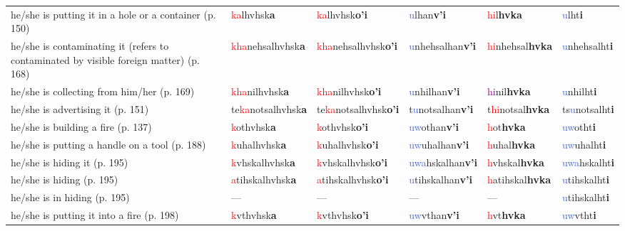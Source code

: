 \documentclass[oneside,openany]{book}%
\begin{document}
\begin{tabularx}{\textwidth}{>{\hsize=1.5\hsize\RaggedRight}X >{\hsize=0.9\hsize}X >{\hsize=0.9\hsize}X >{\hsize=0.9\hsize}X >{\hsize=0.9\hsize}X >{\hsize=0.9\hsize}X}
he/she is putting it in a hole or a container (p. 150)&\textcolor{Red}{ka}lhvhsk\textbf{a}&\textcolor{Red}{ka}lhvhsk\textbf{o'i}&\textcolor{RoyalBlue}{u}lhan\textbf{v'i}&\textcolor{Red}{hi}l\textbf{hvka}&\textcolor{RoyalBlue}{u}lht\textbf{i}\\%
he/she is contaminating it (refers to contaminated by visible foreign matter) (p. 168)&\textcolor{Red}{kha}nehsalhvhsk\textbf{a}&\textcolor{Red}{kha}nehsalhvhsk\textbf{o'i}&\textcolor{RoyalBlue}{u}nhehsalhan\textbf{v'i}&\textcolor{Red}{hi}nhehsal\textbf{hvka}&\textcolor{RoyalBlue}{u}nhehsalht\textbf{i}\\%
he/she is collecting from him/her (p. 169)&\textcolor{Red}{kha}nilhvhsk\textbf{a}&\textcolor{Red}{kha}nilhvhsk\textbf{o'i}&\textcolor{RoyalBlue}{u}nhilhan\textbf{v'i}&\textcolor{Purple}{hi}nil\textbf{hvka}&\textcolor{RoyalBlue}{u}nhilht\textbf{i}\\%
he/she is advertising it (p. 151)&te\textcolor{Red}{ka}notsalhvhsk\textbf{a}&te\textcolor{Red}{ka}notsalhvhsk\textbf{o'i}&t\textcolor{RoyalBlue}{u}notsalhan\textbf{v'i}&t\textcolor{Red}{hi}notsal\textbf{hvka}&ts\textcolor{RoyalBlue}{u}notsalht\textbf{i}\\%
he/she is building a fire (p. 137)&\textcolor{Red}{k}othvhsk\textbf{a}&\textcolor{Red}{k}othvhsk\textbf{o'i}&\textcolor{RoyalBlue}{uw}othan\textbf{v'i}&\textcolor{Red}{h}ot\textbf{hvka}&\textcolor{RoyalBlue}{uw}otht\textbf{i}\\%
he/she is putting a handle on a tool (p. 188)&\textcolor{Red}{k}uhalhvhsk\textbf{a}&\textcolor{Red}{k}uhalhvhsk\textbf{o'i}&\textcolor{RoyalBlue}{uw}uhalhan\textbf{v'i}&\textcolor{Red}{h}uhal\textbf{hvka}&\textcolor{RoyalBlue}{uw}uhalht\textbf{i}\\%
he/she is hiding it (p. 195)&\textcolor{Red}{k}vhskalhvhsk\textbf{a}&\textcolor{Red}{k}vhskalhvhsk\textbf{o'i}&\textcolor{RoyalBlue}{uwa}hskalhan\textbf{v'i}&\textcolor{Red}{h}vhskal\textbf{hvka}&\textcolor{RoyalBlue}{uwa}hskalht\textbf{i}\\%
he/she is hiding (p. 195)&\textcolor{Red}{a}tihskalhvhsk\textbf{a}&\textcolor{Red}{a}tihskalhvhsk\textbf{o'i}&\textcolor{RoyalBlue}{u}tihskalhan\textbf{v'i}&\textcolor{Red}{h}atihskal\textbf{hvka}&\textcolor{RoyalBlue}{u}tihskalht\textbf{i}\\%
he/she is in hiding (p. 195)&---&---&---&---&\textcolor{RoyalBlue}{u}tihskalht\textbf{i}\\%
he/she is putting it into a fire (p. 198)&\textcolor{Red}{k}vthvhsk\textbf{a}&\textcolor{Red}{k}vthvhsk\textbf{o'i}&\textcolor{RoyalBlue}{uw}vthan\textbf{v'i}&\textcolor{Red}{h}vt\textbf{hvka}&\textcolor{RoyalBlue}{uw}vtht\textbf{i}\\%

\end{tabularx}
\end{document}
